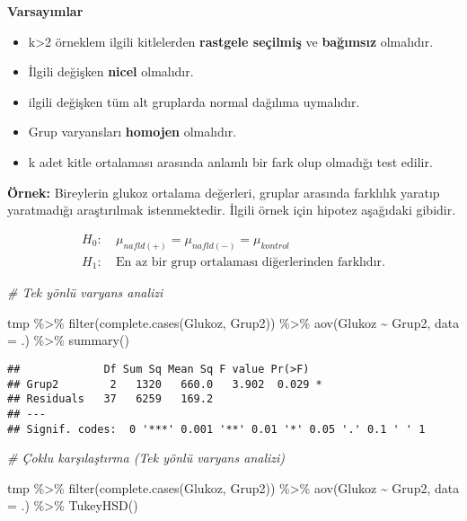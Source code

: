 \documentclass[
]{article}
\newenvironment{Shaded}{\begin{snugshade}}{\end{snugshade}}
\newcommand{\AttributeTok}[1]{\textcolor[rgb]{0.77,0.63,0.00}{#1}}
\newcommand{\CommentTok}[1]{\textcolor[rgb]{0.56,0.35,0.01}{\textit{#1}}}
\newcommand{\FunctionTok}[1]{\textcolor[rgb]{0.00,0.00,0.00}{#1}}
\newcommand{\NormalTok}[1]{#1}
\newcommand{\SpecialCharTok}[1]{\textcolor[rgb]{0.00,0.00,0.00}{#1}}
\providecommand{\tightlist}{%
  \setlength{\itemsep}{0pt}\setlength{\parskip}{0pt}}
\begin{document}
\textbf{Varsayımlar}

\begin{itemize}
\tightlist
\item
  k\textgreater2 örneklem ilgili kitlelerden \textbf{rastgele seçilmiş}
  ve \textbf{bağımsız} olmalıdır.
\item
  İlgili değişken \textbf{nicel} olmalıdır.
\item
  ilgili değişken tüm alt gruplarda normal dağılıma uymalıdır.
\item
  Grup varyansları \textbf{homojen} olmalıdır.
\item
  k adet kitle ortalaması arasında anlamlı bir fark olup olmadığı test
  edilir.
\end{itemize}

\textbf{Örnek:} Bireylerin glukoz ortalama değerleri, gruplar arasında
farklılık yaratıp yaratmadığı araştırılmak istenmektedir. İlgili örnek
için hipotez aşağıdaki gibidir.

\begin{align*}
  H_0:&~ \mu_{nafld(+)} = \mu_{nafld(-)} = \mu_{kontrol} \\
  H_1:&~ \text{En az bir grup ortalaması diğerlerinden farklıdır.}
\end{align*}

\begin{Shaded}
\begin{Highlighting}[]
\CommentTok{\# Tek yönlü varyans analizi}

\NormalTok{tmp }\SpecialCharTok{\%\textgreater{}\%}
  \FunctionTok{filter}\NormalTok{(}\FunctionTok{complete.cases}\NormalTok{(Glukoz, Grup2)) }\SpecialCharTok{\%\textgreater{}\%}
  \FunctionTok{aov}\NormalTok{(Glukoz }\SpecialCharTok{\textasciitilde{}}\NormalTok{ Grup2, }\AttributeTok{data =}\NormalTok{ .) }\SpecialCharTok{\%\textgreater{}\%}
  \FunctionTok{summary}\NormalTok{()}
\end{Highlighting}
\end{Shaded}

\begin{verbatim}
##             Df Sum Sq Mean Sq F value Pr(>F)  
## Grup2        2   1320   660.0   3.902  0.029 *
## Residuals   37   6259   169.2                 
## ---
## Signif. codes:  0 '***' 0.001 '**' 0.01 '*' 0.05 '.' 0.1 ' ' 1
\end{verbatim}

\begin{Shaded}
\begin{Highlighting}[]
\CommentTok{\# Çoklu karşılaştırma (Tek yönlü varyans analizi)}

\NormalTok{tmp }\SpecialCharTok{\%\textgreater{}\%}
  \FunctionTok{filter}\NormalTok{(}\FunctionTok{complete.cases}\NormalTok{(Glukoz, Grup2)) }\SpecialCharTok{\%\textgreater{}\%}
  \FunctionTok{aov}\NormalTok{(Glukoz }\SpecialCharTok{\textasciitilde{}}\NormalTok{ Grup2, }\AttributeTok{data =}\NormalTok{ .) }\SpecialCharTok{\%\textgreater{}\%}
  \FunctionTok{TukeyHSD}\NormalTok{()}
\end{Highlighting}
\end{Shaded}
\end{document}
